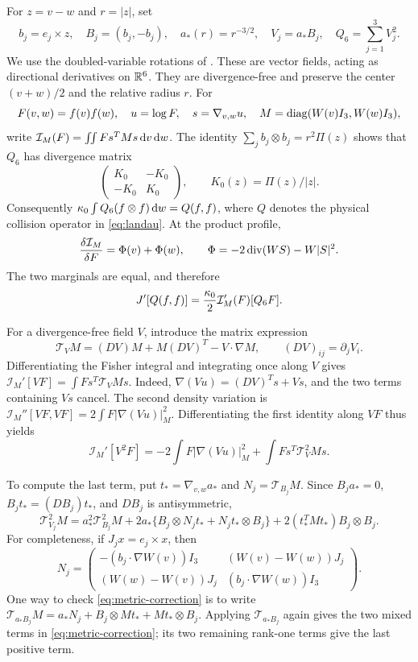 For $z=v-w$ and $r=|z|$, set
\[
 b_j=e_j\times z,\quad B_j=(b_j,-b_j),\quad a_*(r)=r^{-3/2},\quad V_j=a_*B_j,\quad Q_6=\sum_{j=1}^3V_j^2.
\]
We use the doubled-variable rotations of \cite[Sections~3--4]{GS}. These are vector fields, acting as directional derivatives on $\mathbb R^6$. They are divergence-free and preserve the center $(v+w)/2$ and the relative radius $r$. For
\[
 F(v,w)=f(v)f(w),\quad u=\log F,\quad s=\nabla_{v,w}u,\quad
 M=\operatorname{diag}(W(v)I_3,W(w)I_3),
\]
write $\mathcal I_M(F)=\iint F s^TMs\,\mathrm dv\,\mathrm dw$. The identity $\sum_jb_j\otimes b_j=r^2\Pi(z)$ shows that $Q_6$ has divergence matrix
\[
 \begin{pmatrix}K_0&-K_0\\-K_0&K_0\end{pmatrix},\qquad K_0(z)=\Pi(z)/|z|.
\]
Consequently $\kappa_0\int Q_6(f\otimes f)\,\mathrm dw=Q(f,f)$, where $Q$ denotes the physical collision operator in \eqref{eq:landau}. At the product profile,
\[
 \frac{\delta\mathcal I_M}{\delta F}=\Phi(v)+\Phi(w),\qquad
 \Phi=-2\operatorname{div}(WS)-W|S|^2.
\]
The two marginals are equal, and therefore
\begin{equation}\label{eq:product-variation}
 J'[Q(f,f)]=\frac{\kappa_0}{2}\mathcal I_M'(F)[Q_6F].
\end{equation}

For a divergence-free field $V$, introduce the matrix expression
\[
 \mathcal T_VM=(DV)M+M(DV)^T-V\cdot\nabla M,
 \qquad (DV)_{ij}=\partial_jV_i.
\]
Differentiating the Fisher integral and integrating once along $V$ gives
$\mathcal I_M'[VF]=\int F s^T\mathcal T_VM s$. Indeed,
$\nabla(Vu)=(DV)^Ts+Vs$, and the two terms containing $Vs$ cancel. The second density variation is
$\mathcal I_M''[VF,VF]=2\int F|\nabla(Vu)|_M^2$. Differentiating the first identity along $VF$ thus yields
\begin{equation}\label{eq:metric-identity}
 \mathcal I_M'[V^2F]
 =-2\int F|\nabla(Vu)|_M^2+\int F s^T\mathcal T_V^2M s.
\end{equation}

To compute the last term, put $t_* =\nabla_{v,w}a_*$ and $N_j=\mathcal T_{B_j}M$. Since $B_ja_*=0$, $B_jt_*=(DB_j)t_*$, and $DB_j$ is antisymmetric,
\begin{equation}\label{eq:metric-correction}
 \mathcal T_{V_j}^2M
 =a_*^2\mathcal T_{B_j}^2M
 +2a_*\{B_j\otimes N_jt_*+N_jt_*\otimes B_j\}
 +2(t_*^TMt_*)B_j\otimes B_j.
\end{equation}
For completeness, if $J_jx=e_j\times x$, then
\[
 N_j=\begin{pmatrix}
 -(b_j\cdot\nabla W(v))I_3&(W(v)-W(w))J_j\\
 (W(w)-W(v))J_j&(b_j\cdot\nabla W(w))I_3
 \end{pmatrix}.
\]
One way to check \eqref{eq:metric-correction} is to write
$\mathcal T_{a_*B_j}M=a_*N_j+B_j\otimes Mt_*+Mt_*\otimes B_j$.
Applying $\mathcal T_{a_*B_j}$ again gives the two mixed terms in \eqref{eq:metric-correction}; its two remaining rank-one terms give the last positive term.

